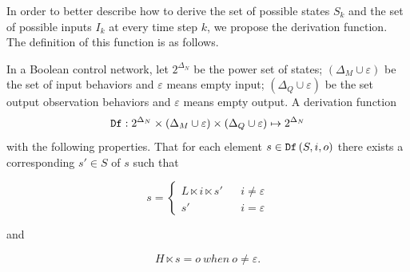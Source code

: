  
In order to better describe how to derive the set of possible states $S_k$ and the set of possible inputs $I_k$ at every time step $k$, we propose the derivation function. The definition of this function is as follows.
\begin{definition} 
In a Boolean control network, let $2^{\Delta_N}$ be the power set of states; $(\Delta_M\cup\varepsilon)$ be the set of input behaviors and $\varepsilon$ means empty input; $(\Delta_Q\cup\varepsilon)$ be the set output observation behaviors and $\varepsilon$ means empty output.
A derivation function \[{\tt Df}:2^{\Delta_N}\times (\Delta_M\cup\varepsilon) \times (\Delta_Q\cup\varepsilon) \mapsto 2^{\Delta_N}\] %
with the following properties. 
	That for each element $s\in {\tt Df}\left(S, i, o\right)$ there exists a corresponding $s'\in S$ of $s$ such that 

\[s=\left\{
\begin{array}{rcl}
L\ltimes i\ltimes s'      &      & {i\neq \varepsilon}\\
s'       &      & {i= \varepsilon}
\end{array} \right. \]

and 

\[H\ltimes s=o\ when\ o\neq \varepsilon.\]

\end{definition}

